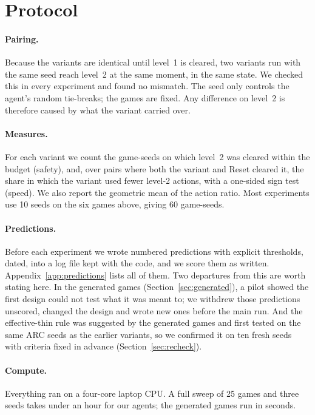 \documentclass[11pt,a4paper]{article}
\begin{document}
\section{Protocol}

\paragraph{Pairing.} Because the variants are identical until level~1 is cleared, two variants run with the same seed reach level~2 at the same moment, in the same state. We checked this in every experiment and found no mismatch. The seed only controls the agent's random tie-breaks; the games are fixed. Any difference on level~2 is therefore caused by what the variant carried over.

\paragraph{Measures.} For each variant we count the game-seeds on which level~2 was cleared within the budget (safety), and, over pairs where both the variant and Reset cleared it, the share in which the variant used fewer level-2 actions, with a one-sided sign test (speed). We also report the geometric mean of the action ratio. Most experiments use 10 seeds on the six games above, giving 60 game-seeds.

\paragraph{Predictions.} Before each experiment we wrote numbered predictions with explicit thresholds, dated, into a log file kept with the code, and we score them as written. Appendix~\ref{app:predictions} lists all of them. Two departures from this are worth stating here. In the generated games (Section~\ref{sec:generated}), a pilot showed the first design could not test what it was meant to; we withdrew those predictions unscored, changed the design and wrote new ones before the main run. And the effective-thin rule was suggested by the generated games and first tested on the same ARC seeds as the earlier variants, so we confirmed it on ten fresh seeds with criteria fixed in advance (Section~\ref{sec:recheck}).

\paragraph{Compute.} Everything ran on a four-core laptop CPU. A full sweep of 25 games and three seeds takes under an hour for our agents; the generated games run in seconds.
\end{document}

